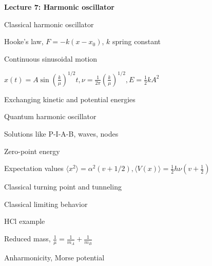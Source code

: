 \message{ !name(Outline.tex)}\documentclass[11pt]{article}
\begin{document}
\begin{outline}
\item{{\bf Lecture 7: Harmonic oscillator}}
  \begin{outline}
  \item{Classical harmonic oscillator}
    \begin{outline}
    \item Hooke's law, $F=-k(x-x_0)$, $k$ spring constant
   \item Continuous sinusoidal motion
    \item $x(t)=A \sin(\frac{k}{\mu})^{1/2}t, \nu=\frac{1}{2\pi}(\frac{k}{\mu})^{1/2}, E=\frac{1}{2}kA^2$
    \item Exchanging kinetic and potential energies
    \end{outline}
  \item Quantum harmonic oscillator
    \begin{outline}
    \item Solutions like P-I-A-B, waves, nodes
   \item Zero-point energy
    \item Expectation values $\langle x^2 \rangle =
      \alpha^2 (v+1/2), \langle V(x) \rangle = \frac{1}{2} h\nu (v+\frac{1}{2})$
    \item Classical turning point and tunneling
    \item Classical limiting behavior
    \end{outline}
  \item HCl example
    \begin{outline}
          \item Reduced mass, $\frac{1}{\mu}=\frac{1}{m_A}+\frac{1}{m_B}$
    \end{outline}
    \item Anharmonicity, Morse potential
  \end{outline}


\end{outline}
\end{document}
